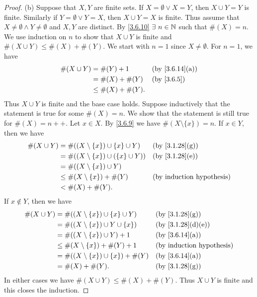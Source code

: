 \begin{proof}{(b)}
  Suppose that \(X, Y\) are finite sets.
  If \(X = \emptyset \lor X = Y\), then \(X \cup Y = Y\) is finite.
  Similarly if \(Y = \emptyset \lor Y = X\), then \(X \cup Y = X\) is finite.
  Thus assume that \(X \neq \emptyset \land Y \neq \emptyset\) and \(X, Y\) are distinct.
  By \cref{3.6.10} \(\exists\ n \in \N\) such that \(\#(X) = n\).
  We use induction on \(n\) to show that \(X \cup Y\) is finite and \(\#(X \cup Y) \leq \#(X) + \#(Y)\).
  We start with \(n = 1\) since \(X \neq \emptyset\).
  For \(n = 1\), we have
  \begin{align*}
    \#(X \cup Y) & = \#(Y) + 1         &  & \text{(by \cref{3.6.14}(a))} \\
                 & = \#(X) + \#(Y)     &  & \text{(by \cref{3.6.5})}     \\
                 & \leq \#(X) + \#(Y).
  \end{align*}
  Thus \(X \cup Y\) is finite and the base case holds.
  Suppose inductively that the statement is true for some \(\#(X) = n\).
  We show that the statement is still true for \(\#(X) = n++\).
  Let \(x \in X\).
  By \cref{3.6.9} we have \(\#(X \setminus \{x\}) = n\).
  If \(x \in Y\), then we have
  \begin{align*}
    \#(X \cup Y) & = \#((X \setminus \{x\}) \cup \{x\} \cup Y)   &  & \text{(by \cref{3.1.28}(g))}     \\
                 & = \#((X \setminus \{x\}) \cup (\{x\} \cup Y)) &  & \text{(by \cref{3.1.28}(e))}     \\
                 & = \#((X \setminus \{x\}) \cup Y)                                                    \\
                 & \leq \#(X \setminus \{x\}) + \#(Y)            &  & \text{(by induction hypothesis)} \\
                 & < \#(X) + \#(Y).
  \end{align*}
  If \(x \notin Y\), then we have
  \begin{align*}
    \#(X \cup Y) & = \#((X \setminus \{x\}) \cup \{x\} \cup Y)  &  & \text{(by \cref{3.1.28}(g))}     \\
                 & = \#((X \setminus \{x\}) \cup Y \cup \{x\})  &  & \text{(by \cref{3.1.28}(d)(e))}  \\
                 & = \#((X \setminus \{x\}) \cup Y) + 1         &  & \text{(by \cref{3.6.14}(a))}     \\
                 & \leq \#(X \setminus \{x\}) + \#(Y) + 1       &  & \text{(by induction hypothesis)} \\
                 & = \#((X \setminus \{x\}) \cup \{x\}) + \#(Y) &  & \text{(by \cref{3.6.14}(a))}     \\
                 & = \#(X) + \#(Y).                             &  & \text{(by \cref{3.1.28}(g))}
  \end{align*}
  In either cases we have \(\#(X \cup Y) \leq \#(X) + \#(Y)\).
  Thus \(X \cup Y\) is finite and this closes the induction.


\end{proof}

